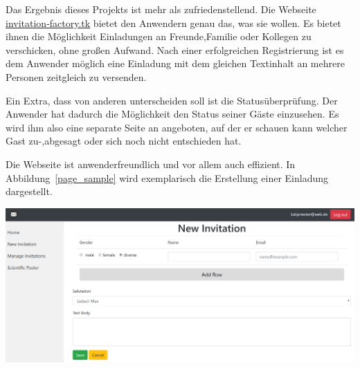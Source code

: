 \documentclass[landscape,a0paper,fontscale=0.35]{baposter} %
\begin{document}
\begin{poster}

{
	\begin{multicols}{3}
		Das Ergebnis dieses Projekts ist mehr als zufriedenstellend. Die Webseite \url{invitation-factory.tk} bietet den Anwendern genau das, was sie wollen. Es bietet ihnen die Möglichkeit Einladungen an Freunde,Familie oder Kollegen zu verschicken, ohne großen Aufwand. Nach einer erfolgreichen Registrierung ist es dem Anwender möglich eine Einladung mit dem gleichen Textinhalt an mehrere Personen zeitgleich zu versenden.
		
		Ein Extra, dass von anderen unterscheiden soll ist die Statusüberprüfung. Der Anwender hat dadurch die Möglichkeit den Status seiner Gäste einzusehen. Es wird ihm also eine separate Seite an angeboten, auf der er schauen kann welcher Gast zu-,abgesagt oder sich noch nicht entschieden hat.
		
		Die Webseite ist anwenderfreundlich und vor allem auch effizient. In Abbildung~\ref{page_sample} wird exemplarisch die Erstellung einer Einladung dargestellt.

		\begin{center}
			\includegraphics[width=0.65\linewidth]{New_Invitation_Seite.PNG}
			\label{page_sample}
		\end{center}
	\end{multicols}
}
\end{poster}
\end{document}
